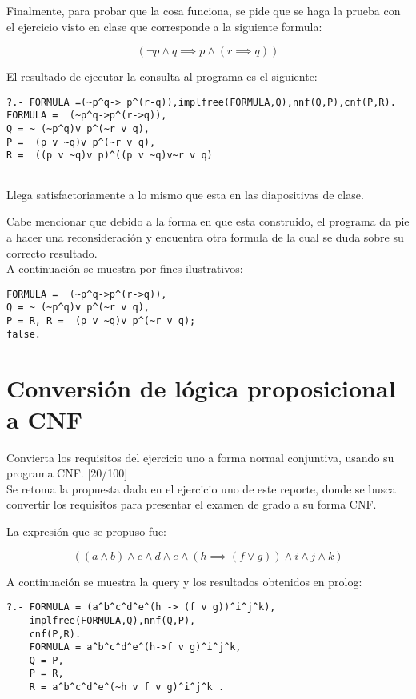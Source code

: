 \documentclass[11pt, letterpaper]{article}
\begin{document}
Finalmente, para probar que la cosa funciona, se pide que se haga la prueba con el ejercicio visto en clase que corresponde a la siguiente formula:

$$(\neg p \wedge q \implies p \wedge (r \implies q))$$

El resultado de ejecutar la consulta al programa es el siguiente:

\begin{verbatim}
?.- FORMULA =(~p^q-> p^(r-q)),implfree(FORMULA,Q),nnf(Q,P),cnf(P,R).
FORMULA =  (~p^q->p^(r->q)),
Q = ~ (~p^q)v p^(~r v q),
P =  (p v ~q)v p^(~r v q),
R =  ((p v ~q)v p)^((p v ~q)v~r v q) 
	
\end{verbatim}

Llega satisfactoriamente a lo mismo que esta en las diapositivas de clase.

Cabe mencionar que debido a la forma en que esta construido, el programa da pie a hacer una reconsideración y encuentra otra formula de la cual se duda sobre su correcto resultado. \\

A continuación se muestra por fines ilustrativos:

\begin{verbatim}
FORMULA =  (~p^q->p^(r->q)),
Q = ~ (~p^q)v p^(~r v q),
P = R, R =  (p v ~q)v p^(~r v q);
false.
\end{verbatim}



			
	\newpage
	
	\section{Conversión de lógica proposicional a CNF}
	
	Convierta los requisitos del ejercicio uno a forma normal conjuntiva, usando
	su programa CNF. [20/100] \\
	
	Se retoma la propuesta dada en el ejercicio uno de este reporte, donde se busca convertir los requisitos para presentar el examen de grado a su forma CNF.
	
	La expresión que se propuso fue:
	
	$$((a \wedge b) \wedge c \wedge d \wedge e \wedge (h \implies (f \vee g)) \wedge i \wedge j \wedge k)$$
	
	A continuación se muestra la query y los resultados obtenidos en prolog:
	
\begin{verbatim}
?.- FORMULA = (a^b^c^d^e^(h -> (f v g))^i^j^k),
	implfree(FORMULA,Q),nnf(Q,P),
	cnf(P,R).
	FORMULA = a^b^c^d^e^(h->f v g)^i^j^k,
	Q = P,
	P = R, 
	R = a^b^c^d^e^(~h v f v g)^i^j^k .
	
\end{verbatim}
	
\end{document}
